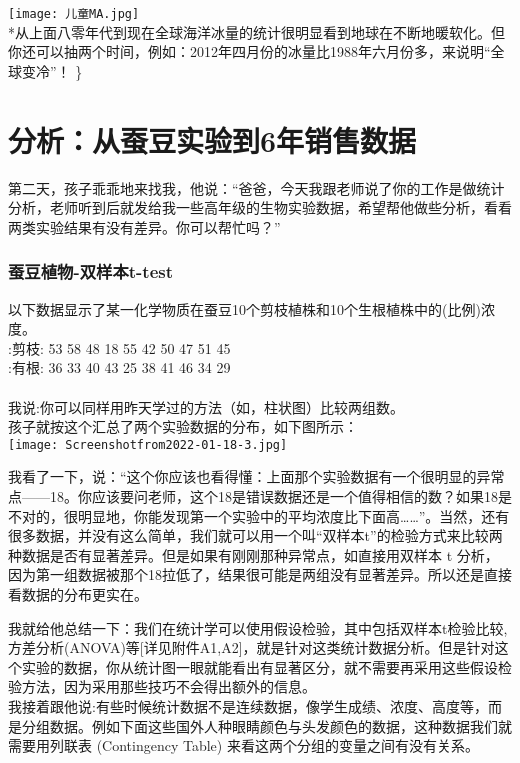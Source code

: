 \texttt{[image: 儿童MA.jpg]}\\
*从上面八零年代到现在全球海洋冰量的统计很明显看到地球在不断地暖软化。但你还可以抽两个时间，例如：2012年四月份的冰量比1988年六月份多，来说明``全球变冷''！
\textbar{}\}

\hypertarget{ux5206ux6790ux4eceux8695ux8c46ux5b9eux9a8cux52306ux5e74ux9500ux552eux6570ux636e}{%
\section{分析：从蚕豆实验到6年销售数据}\label{ux5206ux6790ux4eceux8695ux8c46ux5b9eux9a8cux52306ux5e74ux9500ux552eux6570ux636e}}

第二天，孩子乖乖地来找我，他说：``爸爸，今天我跟老师说了你的工作是做统计分析，老师听到后就发给我一些高年级的生物实验数据，希望帮他做些分析，看看两类实验结果有没有差异。你可以帮忙吗？''\\

\hypertarget{ux8695ux8c46ux690dux7269-ux53ccux6837ux672ct-test}{%
\subsubsection{蚕豆植物-双样本t-test}\label{ux8695ux8c46ux690dux7269-ux53ccux6837ux672ct-test}}

以下数据显示了某一化学物质在蚕豆10个剪枝植株和10个生根植株中的(比例)浓度。\\
:剪枝: 53 58 48 18 55 42 50 47 51 45\\
:有根: 36 33 40 43 25 38 41 46 34 29\\
~\\
我说:你可以同样用昨天学过的方法（如，柱状图）比较两组数。\\
孩子就按这个汇总了两个实验数据的分布，如下图所示：\\

\texttt{[image: Screenshotfrom2022-01-18-3.jpg]}

我看了一下，说：``这个你应该也看得懂：上面那个实验数据有一个很明显的异常点------18。你应该要问老师，这个18是错误数据还是一个值得相信的数？如果18是不对的，很明显地，你能发现第一个实验中的平均浓度比下面高\ldots{}\ldots{}''。当然，还有很多数据，并没有这么简单，我们就可以用一个叫``双样本t''的检验方式来比较两种数据是否有显著差异。但是如果有刚刚那种异常点，如直接用双样本
t
分析，因为第一组数据被那个18拉低了，结果很可能是两组没有显著差异。所以还是直接看数据的分布更实在。

我就给他总结一下：我们在统计学可以使用假设检验，其中包括双样本t检验比较,方差分析(ANOVA)等{[}详见附件A1,A2{]}，就是针对这类统计数据分析。但是针对这个实验的数据，你从统计图一眼就能看出有显著区分，就不需要再采用这些假设检验方法，因为采用那些技巧不会得出额外的信息。\\
我接着跟他说:有些时候统计数据不是连续数据，像学生成绩、浓度、高度等，而是分组数据。例如下面这些国外人种眼睛颜色与头发颜色的数据，这种数据我们就需要用列联表
(Contingency Table) 来看这两个分组的变量之间有没有关系。\\

